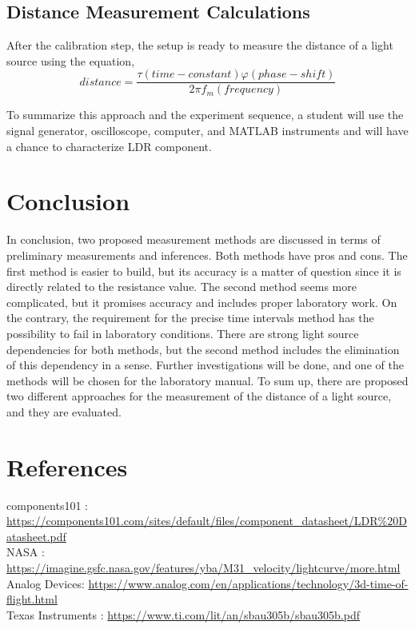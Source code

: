 \documentclass[letterpaper,12pt]{article}
\begin{document}
\subsection{Distance Measurement Calculations}
After the calibration step, the setup is ready to measure the distance of a light source using the equation,
\[distance = \frac{  \tau (time-constant)  \varphi (phase-shift)  }{2 \pi f_m (frequency)}\]

To summarize this approach and the experiment sequence, a student will use the signal generator, oscilloscope, computer, and MATLAB instruments and will have a chance to characterize LDR component. 
\section{Conclusion}
In conclusion, two proposed measurement methods are discussed in terms of preliminary measurements and inferences. Both methods have pros and cons. The first method is easier to build, but its accuracy is a matter of question since it is directly related to the resistance value. The second method seems more complicated, but it promises accuracy and includes proper laboratory work. On the contrary, the requirement for the precise time intervals method has the possibility to fail in laboratory conditions. There are strong light source dependencies for both methods, but the second method includes the elimination of this dependency in a sense. Further investigations will be done, and one of the methods will be chosen for the laboratory manual. To sum up, there are proposed two different approaches for the measurement of the distance of a light source, and they are evaluated.   




\section{References}
\label{sec:ref}
components101 : \url{https://components101.com/sites/default/files/component_datasheet/LDR\%20Datasheet.pdf} \\

NASA : \url{https://imagine.gsfc.nasa.gov/features/yba/M31_velocity/lightcurve/more.html} \\

Analog Devices: \url{https://www.analog.com/en/applications/technology/3d-time-of-flight.html} \\

Texas Instruments : \url{https://www.ti.com/lit/an/sbau305b/sbau305b.pdf} \\
\end{document}

